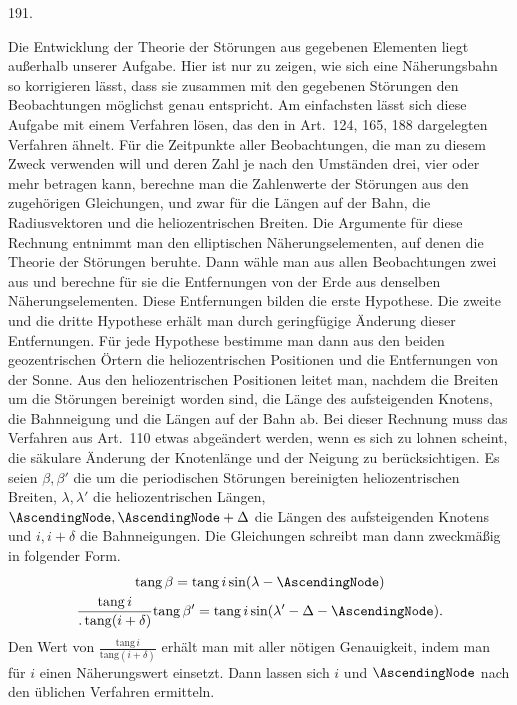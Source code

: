 \begin{center}\hypertarget{native-265-article191}{}191.\end{center}
Die Entwicklung der Theorie der Störungen aus gegebenen Elementen liegt
außerhalb unserer Aufgabe. Hier ist nur zu zeigen, wie sich eine
Näherungsbahn so korrigieren lässt, dass sie zusammen mit den gegebenen
Störungen den Beobachtungen möglichst genau entspricht. Am einfachsten
lässt sich diese Aufgabe mit einem Verfahren lösen, das den in
Art.~124, 165, 188 dargelegten Verfahren ähnelt. Für die Zeitpunkte
aller Beobachtungen, die man zu diesem Zweck verwenden will und deren
Zahl je nach den Umständen drei, vier oder mehr betragen kann, berechne
man die Zahlenwerte der Störungen aus den zugehörigen Gleichungen, und
zwar für die Längen auf der Bahn, die Radiusvektoren und die heliozentrischen Breiten.
Die Argumente für diese Rechnung entnimmt man den elliptischen
Näherungselementen, auf denen die Theorie der Störungen beruhte. Dann
wähle man aus allen Beobachtungen zwei aus und berechne für sie die
Entfernungen von der Erde aus denselben Näherungselementen. Diese
Entfernungen bilden die erste Hypothese. Die zweite und die dritte
Hypothese erhält man durch geringfügige Änderung dieser Entfernungen.
Für jede Hypothese bestimme man dann aus den beiden geozentrischen
Örtern die heliozentrischen Positionen und die Entfernungen von der
Sonne. Aus den heliozentrischen Positionen leitet man, nachdem die
Breiten um die Störungen bereinigt worden sind, die Länge des
aufsteigenden Knotens, die Bahnneigung und die Längen auf der Bahn ab.
Bei dieser Rechnung muss das Verfahren aus Art.~110 etwas abgeändert
werden, wenn es sich zu lohnen scheint, die säkulare Änderung der
Knotenlänge und der Neigung zu berücksichtigen. Es seien $\beta,\beta'$
die um die periodischen Störungen bereinigten heliozentrischen Breiten,
$\lambda,\lambda'$ die heliozentrischen Längen, $\AscendingNode,\AscendingNode+\Delta$
die Längen des aufsteigenden Knotens und $i,i+\delta$ die Bahnneigungen.
Die Gleichungen schreibt man dann zweckmäßig in folgender Form.
\[
\begin{gathered}
\mathrm{tang}\,\beta=\mathrm{tang}\,i\sin(\lambda-\AscendingNode)\\
\frac{\mathrm{tang}\,i}{\mathpunct{.}\mathrm{tang}(i+\delta)}\mathrm{tang}\,\beta'
=\mathrm{tang}\,i\sin(\lambda'-\Delta-\AscendingNode).
\end{gathered}
\]
Den Wert von $\frac{\mathrm{tang}\,i}{\mathrm{tang}(i+\delta)}$
erhält man mit aller nötigen Genauigkeit, indem man für $i$ einen
Näherungswert einsetzt. Dann lassen sich $i$ und $\AscendingNode$ nach den
üblichen Verfahren ermitteln.

